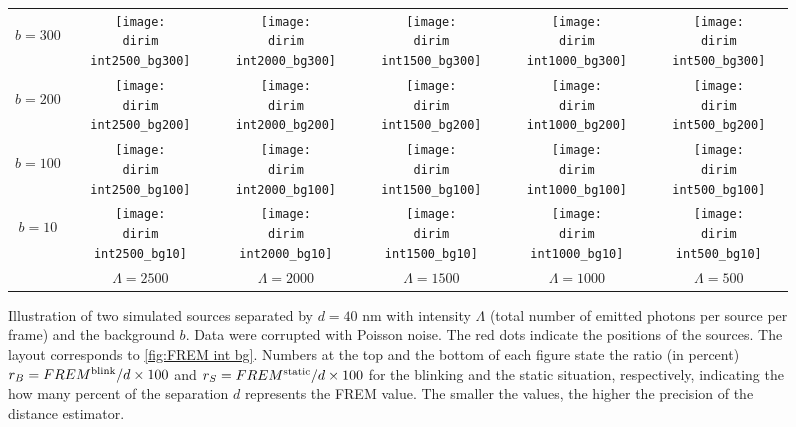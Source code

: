\begin{figure}[!hbt]
	\centering
	\newcommand{\wf}{.14\textwidth}
	\newcommand{\dirim}{\qd gFREM/images/psf2/text_twosources_}
	\newcommand{\vs}{.4}
	\begin{tabular}{c|ccccc}
		\begin{sideways}\hspace{\vs cm}$b=300$\end{sideways}
		&\texttt{[image: \\dirim int2500\_bg300]}
		&\texttt{[image: \\dirim int2000\_bg300]}
		&\texttt{[image: \\dirim int1500\_bg300]}
		&\texttt{[image: \\dirim int1000\_bg300]}
		&\texttt{[image: \\dirim int500\_bg300]}\\
		\begin{sideways}\hspace{\vs cm}$b=200$\end{sideways}
		&\texttt{[image: \\dirim int2500\_bg200]}
		&\texttt{[image: \\dirim int2000\_bg200]}
		&\texttt{[image: \\dirim int1500\_bg200]}
		&\texttt{[image: \\dirim int1000\_bg200]}
		&\texttt{[image: \\dirim int500\_bg200]}\\
		\begin{sideways}\hspace{\vs cm}$b=100$\end{sideways}
		&\texttt{[image: \\dirim int2500\_bg100]}
		&\texttt{[image: \\dirim int2000\_bg100]}
		&\texttt{[image: \\dirim int1500\_bg100]}
		&\texttt{[image: \\dirim int1000\_bg100]}
		&\texttt{[image: \\dirim int500\_bg100]}\\
		\begin{sideways}\hspace{\vs cm}$b=10$\end{sideways}
		&\texttt{[image: \\dirim int2500\_bg10]}
		&\texttt{[image: \\dirim int2000\_bg10]}
		&\texttt{[image: \\dirim int1500\_bg10]}
		&\texttt{[image: \\dirim int1000\_bg10]}
		&\texttt{[image: \\dirim int500\_bg10]}\\
		\hline	
		&$\Lambda=2500$ & $\Lambda=2000$ & $\Lambda=1500$ & $\Lambda=1000$ & $\Lambda=500$\\
	\end{tabular}
	\caption{Illustration of two simulated sources separated by $d=40$ nm with intensity $\Lambda$ (total number of emitted photons per source per frame) and the background $b$. Data were corrupted with Poisson noise. The red dots indicate the positions of the sources. The layout corresponds to \autoref{fig:FREM int bg}. Numbers at the top and the bottom of each figure state the ratio (in percent) $r_B=FREM^{\textrm{blink}}/d\times100$ and $r_S=FREM^{\textrm{static}}/d\times100$ for the blinking and the static situation, respectively, indicating the how many percent of the separation $d$ represents the FREM value. The smaller the values, the higher the precision of the distance estimator.}
	\label{fig:two sources int bg}
\end{figure}
